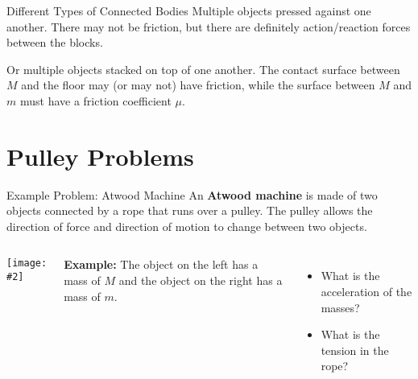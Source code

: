 \documentclass[12pt,compress,aspectratio=169]{beamer}
\newcommand{\pic}[2]{\texttt{[image: \#2]}}
\begin{document}
\begin{frame}{Different Types of Connected Bodies}
  Multiple objects pressed against one another. There may not be friction, but
  there are definitely action/reaction forces between the blocks.
  \begin{center}
  \end{center}
  Or multiple objects stacked on top of one another. The contact surface between
  $M$ and the floor may (or may not) have friction, while the surface between
  $M$ and $m$ must have a friction coefficient $\mu$.
  \begin{center}
  \end{center}
\end{frame}


\section{Pulley Problems}

\begin{frame}{Example Problem: Atwood Machine}
  An \textbf{Atwood machine} is made of two objects connected by a rope that
  runs over a pulley. The pulley allows the direction of force and direction
  of motion to change between two objects.
  \begin{columns}
    \begin{center}
      \pic{1}{graphics/pulley_prob_2}
    \end{center}
    \textbf{Example:} The object on the left has a mass of $M$ and the object
    on the right has a mass of $m$.
    \begin{itemize}
    \item What is the acceleration of the masses?
    \item What is the tension in the rope?
    \end{itemize}
  \end{columns}
\end{frame}
\end{document}
